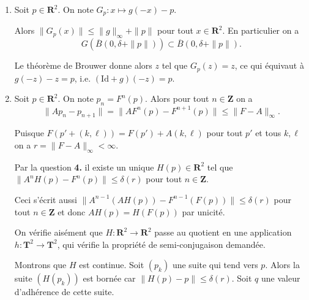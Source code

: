 \documentclass[a4paper,12pt,openany]{article}
\theoremstyle{plain}
\theoremstyle{definition}
\newcommand{\T}{\mathbf{T}}
\newcommand{\R}{\mathbf{R}}
\newcommand{\Z}{\mathbf{Z}}
\newcommand{\Id}{\mathrm{Id}}
\begin{document}
\begin{enumerate}[resume]
Par $(*)$ (en faisant $k \to +\infty$) on a 
$$|\lambda^na - a_n| \leqslant \frac{|\lambda|r}{|\lambda| - 1}, \quad n \in \Z,$$
et la m\^eme in\'egalit\'e est vraie pour $|\lambda^{-n}b - b_{n}|$.



On conclut que $\|A^n q - p_n\| \leq C\displaystyle{ \frac{|\lambda|r}{|\lambda| - 1} = \delta(r)}$ pour tout $n \in \Z.$




L'unicit\'e est claire puisque $\|A^n(q-q')\| \leq 2 \delta$ pour tout $n \in \Z$ implique $y = y'$.

\item Soit $p \in \R^2$. On note $G_p : x \mapsto g(-x) - p$. 



Alors $\|G_p(x)\| \leqslant \|g\|_\infty + \|p\|$ pour tout $x \in \R^2$.  En particulier on a 
$$
G\left(\overline{B}(0, \delta + \|p\|)\right) \subset\overline{B}(0, \delta + \|p\|).
$$

Le th\'eor\`eme de Brouwer donne alors $z$ tel que $G_p(z) = z$, ce qui \'equivaut \`a $g(-z) - z = p$, i.e. $(\Id + g)(-z) = p.$

\item Soit $p \in \R^2.$ On note $p_n = F^n(p)$. Alors pour tout $n \in \Z$ on a
$$
\|Ap_n - p_{n+1}\| = \|AF^n(p) - F^{n+1}(p)\| \leqslant \|F-A\|_{\infty}.
$$

Puisque $F(p' + (k, \ell)) = F(p') + A(k, \ell)$ pour tout $p'$ et tous $k,\ell$ on a $r = \|F-A\|_\infty < \infty.$ 



Par la question \textbf{4.} il existe un unique $H(p) \in \R^2$ tel que $\|A^nH(p) - F^n(p)\| \leqslant \delta(r)$ pour tout $n \in \Z.$




Ceci s'\'ecrit aussi $\|A^{n-1}(AH(p)) - F^{n-1}(F(p))\| \leqslant \delta(r)$ pour tout $n \in \Z$ et donc $AH(p) = H(F(p))$ par unicit\'e.
 
 


On v\'erifie ais\'ement que $H : \R^2 \to \R^2$ passe au quotient en une application $h : \T^2 \to \T^2$, qui v\'erifie la propri\'et\'e de semi-conjugaison demand\'ee.

 


Montrons que $H$ est continue. Soit $(p_k)$ une suite qui tend vers $p$. Alors la suite $(H(p_k))$ est born\'ee car $\|H(p) - p\| \leqslant \delta(r)$. Soit $q$ une valeur d'adh\'erence de cette suite.
 


\end{enumerate}
\end{document}
